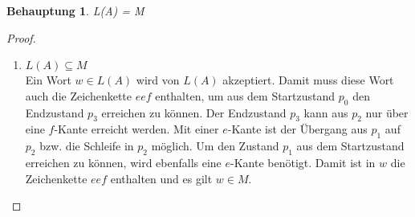 \documentclass[a4paper]{scrartcl}
\newtheorem*{behaupt}{Behauptung}
\begin{document}
\begin{enumerate}
\begin{center}
        \end{center}
        \begin{behaupt}
            L(A) = M
        \end{behaupt}
        \begin{proof}
            \begin{enumerate}
                \item $L(A) \subseteq M$ \hfill \\
                    Ein Wort $w \in L(A)$ wird von $L(A)$ akzeptiert.
                    Damit muss diese Wort auch die Zeichenkette $eef$ enthalten,
                    um aus dem Startzustand $p_0$ den Endzustand $p_3$ erreichen
                    zu können.
                    Der Endzustand $p_3$ kann aus $p_2$ nur über eine $f$-Kante
                    erreicht werden.
                    Mit einer $e$-Kante ist der Übergang aus $p_1$ auf $p_2$
                    bzw. die Schleife in $p_2$ möglich.
                    Um den Zustand $p_1$ aus dem Startzustand erreichen zu
                    können, wird ebenfalls eine $e$-Kante benötigt.
                    Damit ist in $w$ die Zeichenkette $eef$ enthalten und es
                    gilt $w \in M$.


\end{enumerate}
\end{proof}
\end{enumerate}
\end{document}
